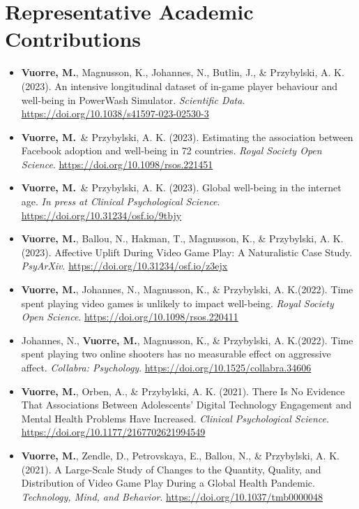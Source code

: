 \documentclass[12pt, a4paper]{article}
\newcommand{\years}[1]{\marginnote{\scriptsize #1}}
\newcommand{\vuorre}{\textbf{Vuorre, M.}}
\begin{document}
\section*{Representative Academic Contributions}
\begin{itemize}
  \item \years{2023} \vuorre, Magnusson, K., Johannes, N., Butlin, J., \& Przybylski, A. K. (2023). An intensive longitudinal dataset of in-game player behaviour and well-being in PowerWash Simulator. \emph{Scientific Data}. \url{https://doi.org/10.1038/s41597-023-02530-3}
  \item \vuorre\ \& Przybylski, A. K. (2023). Estimating the association between Facebook adoption and well-being in 72 countries. \emph{Royal Society Open Science}. \url{https://doi.org/10.1098/rsos.221451}
  \item \vuorre\ \& Przybylski, A. K. (2023). Global well-being in the internet age. \emph{In press at Clinical Psychological Science}. \url{https://doi.org/10.31234/osf.io/9tbjy}
  \item \vuorre, Ballou, N., Hakman, T., Magnusson, K., \& Przybylski, A. K. (2023). Affective Uplift During Video Game Play: A Naturalistic Case Study. \emph{PsyArXiv}. \url{https://doi.org/10.31234/osf.io/z3ejx}
  \item \years{2022} \vuorre\footnotemark[1], Johannes, N.\footnotemark[1], Magnusson, K., \& Przybylski, A. K.\footnotemark[1] (2022). Time spent playing video games is unlikely to impact well-being. \emph{Royal Society Open Science}. \url{https://doi.org/10.1098/rsos.220411}
  \item Johannes, N.\footnotemark[1], \vuorre\footnotemark[1], Magnusson, K., \& Przybylski, A. K.\footnotemark[1] (2022). Time spent playing two online shooters has no measurable effect on aggressive affect. \emph{Collabra: Psychology}. \url{https://doi.org/10.1525/collabra.34606}
  \item \years{2021} \vuorre, Orben, A., \& Przybylski, A. K. (2021). There Is No Evidence That Associations Between Adolescents’ Digital Technology Engagement and Mental Health Problems Have Increased. \emph{Clinical Psychological Science}. \\ \url{https://doi.org/10.1177/2167702621994549}
  \item \vuorre, Zendle, D., Petrovskaya, E., Ballou, N., \& Przybylski, A. K. (2021). A Large-Scale Study of Changes to the Quantity, Quality, and Distribution of Video Game Play During a Global Health Pandemic. \emph{Technology, Mind, and Behavior}. \url{https://doi.org/10.1037/tmb0000048}

\end{itemize}
\end{document}
